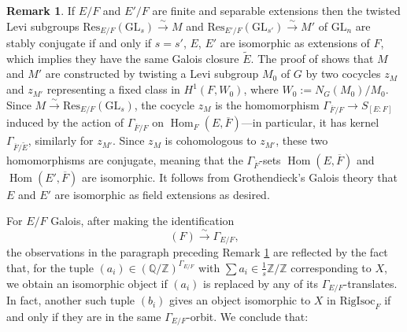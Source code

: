 \documentclass[11pt]{amsart}
\theoremstyle{definition}
\newtheorem{rem}[thm]{Remark}
\newcommand{\Z}{\mathbb{Z}}
\newcommand{\Q}{\mathbb{Q}}
\newcommand{\ov}{\overline}
\newcommand{\Res}{\mathrm{Res}}
\newcommand{\RigIsoc}{\mathrm{RigIsoc}}
\newcommand{\GL}{\mathrm{GL}}
\DeclareMathOperator{\Hom}{Hom}
\begin{document}
  \begin{rem}\label{Galrem}  If $E/F$ and $E'/F$ are finite and separable extensions then the twisted Levi subgroups $\Res_{E/F}(\GL_{s}) \xrightarrow{\sim} M$ and $\Res_{E'/F}(\GL_{s'}) \xrightarrow{\sim} M'$ of $\GL_{n}$ are stably conjugate if and only if $s = s'$, $E$, $E'$ are isomorphic as extensions of $F$, which implies they have the same Galois closure $\widetilde{E}$. The proof of \cite[Lemma 4.3.4]{FintzenSchwein} shows that $M$ and $M'$ are constructed by twisting a Levi subgroup $M_{0}$ of $G$ by two cocycles $z_{M}$ and $z_{M'}$ representing a fixed class in $H^{1}(F,W_{0})$, where $W_{0} := N_{G}(M_{0})/M_{0}$. Since $M \xrightarrow{\sim} \Res_{E/F}(\GL_{s})$, the cocycle $z_{M}$ is the homomorphism $\Gamma_{\ov{F}/F} \to S_{[E \colon F]}$ induced by the action of $\Gamma_{\ov{F}/F}$ on $\Hom_{F}(E,\ov{F})$---in particular, it has kernel $\Gamma_{\ov{F}/\widetilde{E}}$, similarly for $z_{M'}$. Since $z_{M}$ is cohomologous to $z_{M'}$, these two homomorphisms are conjugate, meaning that the $\Gamma_{\ov{F}}$-sets $\Hom(E, \ov{F})$ and $\Hom(E', \ov{F})$ are isomorphic. It follows from Grothendieck's Galois theory that $E$ and $E'$ are isomorphic as field extensions as desired. 
  \end{rem}

    For $E/F$ Galois, after making the identification 
    \begin{equation*}
        [N_{G}(M)/M](F) \xrightarrow{\sim} \Gamma_{E/F},
    \end{equation*}
    the observations in the paragraph preceding Remark \ref{Galrem} are reflected by the fact that, for the tuple $(a_{i}) \in (\Q/\Z)^{\Gamma_{E/F}}$ with $\sum a_{i} \in \frac{1}{s}\Z/\Z$ corresponding to $X$, we obtain an isomorphic object if $(a_{i})$ is replaced by any of its $\Gamma_{E/F}$-translates. In fact, another such tuple $(b_{i})$ gives an object isomorphic to $X$ in $\RigIsoc_{F}$ if and only if they are in the same $\Gamma_{E/F}$-orbit. We conclude that:
    
\end{document}
